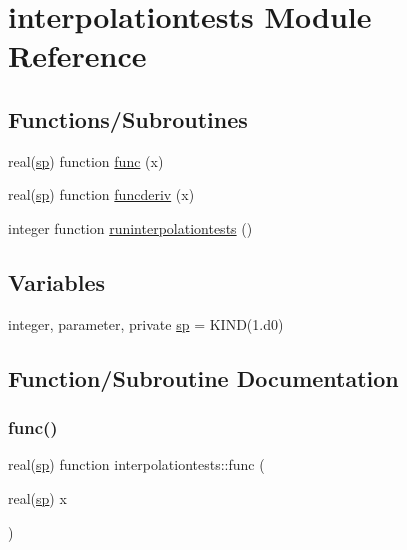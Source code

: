 \hypertarget{namespaceinterpolationtests}{}\section{interpolationtests Module Reference}
\label{namespaceinterpolationtests}
\subsection*{Functions/\+Subroutines}
\begin{DoxyCompactItemize}
\item 
real(\mbox{\hyperlink{namespaceinterpolationtests_a4e83007da3730863a762c2e30c3d336f}{sp}}) function \mbox{\hyperlink{namespaceinterpolationtests_a889784a516823bb7b55caeb7622465a2}{func}} (x)
\item 
real(\mbox{\hyperlink{namespaceinterpolationtests_a4e83007da3730863a762c2e30c3d336f}{sp}}) function \mbox{\hyperlink{namespaceinterpolationtests_a8d9832ae7aac0f3abc5823bfb68e8a85}{funcderiv}} (x)
\item 
integer function \mbox{\hyperlink{namespaceinterpolationtests_a4884e2815dc1d6e85e77392363e72b83}{runinterpolationtests}} ()
\end{DoxyCompactItemize}
\subsection*{Variables}
\begin{DoxyCompactItemize}
\item 
integer, parameter, private \mbox{\hyperlink{namespaceinterpolationtests_a4e83007da3730863a762c2e30c3d336f}{sp}} = K\+I\+ND(1.d0)
\end{DoxyCompactItemize}


\subsection{Function/\+Subroutine Documentation}
\mbox{\label{namespaceinterpolationtests_a889784a516823bb7b55caeb7622465a2}} 
\subsubsection{\texorpdfstring{func()}{func()}}
{\footnotesize\ttfamily real(\mbox{\hyperlink{namespaceinterpolationtests_a4e83007da3730863a762c2e30c3d336f}{sp}}) function interpolationtests\+::func (\begin{DoxyParamCaption}\item[{real(\mbox{\hyperlink{namespaceinterpolationtests_a4e83007da3730863a762c2e30c3d336f}{sp}})}]{x }\end{DoxyParamCaption})}



